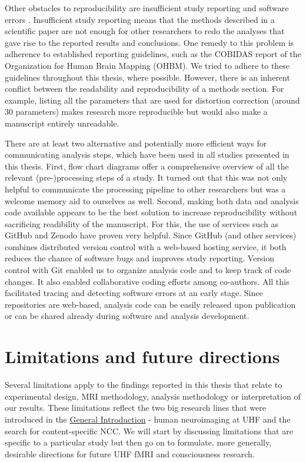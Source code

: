Other obstacles to reproducibility are insufficient study reporting and software errors \parencite{Eklund2016}. Insufficient study reporting means that the methods described in a scientific paper are not enough for other researchers to redo the analyses that gave rise to the reported results and conclusions. One remedy to this problem is adherence to established reporting guidelines, such as the COBIDAS report \parencite{Nichols2017} of the Organization for Human Brain Mapping (OHBM). We tried to adhere to these guidelines throughout this thesis, where possible. However, there is an inherent conflict between the readability and reproducibility of a methods section. For example, listing all the parameters that are used for distortion correction (around 30 parameters) makes research more reproducible but would also make a manuscript entirely unreadable.

There are at least two alternative and potentially more efficient ways for communicating analysis steps, which have been used in all studies presented in this thesis. First, flow chart diagrams offer a comprehensive overview of all the relevant (pre-)processing steps of a study. It turned out that this was not only helpful to communicate the processing pipeline to other researchers but was a welcome memory aid to ourselves as well. Second, making both data and analysis code available appears to be the best solution to increase reproducibility without sacrificing readibility of the manuscript. For this, the use of services such as GitHub and Zenodo have proven very helpful. Since GitHub (and other services) combines distributed version control with a web-based hosting service, it both reduces the chance of software bugs and improves study reporting. Version control with Git enabled us to organize analysis code and to keep track of code changes. It also enabled collaborative coding efforts among co-authors. All this facilitated tracing and detecting software errors at an early stage. Since repositories are web-based, analysis code can be easily released upon publication or can be shared already during software and analysis development.

\section{Limitations and future directions}
Several limitations apply to the findings reported in this thesis that relate to experimental design, MRI methodology, analysis methodology or interpretation of our results. These limitations reflect the two big research lines that were introduced in the \hyperref[ch:chapter01]{General Introduction} - human neuroimaging at UHF and the search for content-specific NCC. We will start by discussing limitations that are specific to a particular study but then go on to formulate, more generally, desirable directions for future UHF fMRI and consciousness research.

